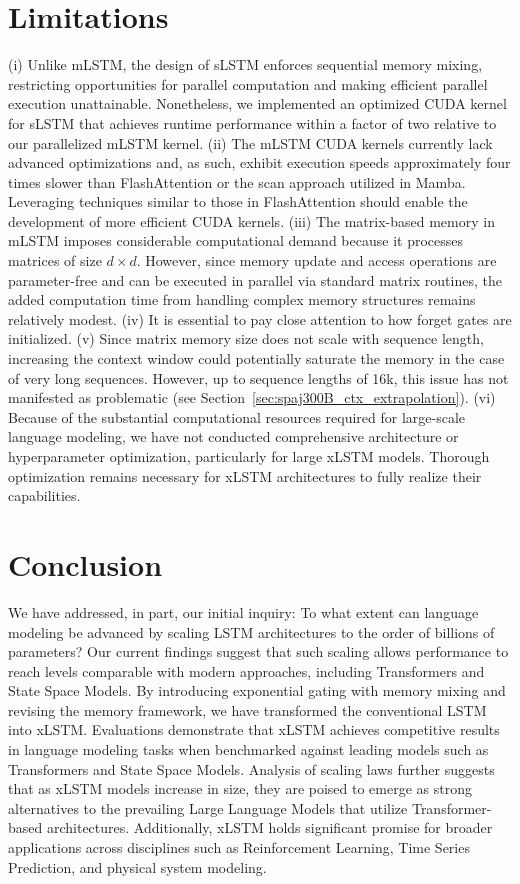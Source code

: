 \section{Limitations}

(i) Unlike mLSTM, the design of sLSTM enforces sequential memory mixing, restricting opportunities for parallel computation and making efficient parallel execution unattainable. Nonetheless, we implemented an optimized CUDA kernel for sLSTM that achieves runtime performance within a factor of two relative to our parallelized mLSTM kernel. (ii) The mLSTM CUDA kernels currently lack advanced optimizations and, as such, exhibit execution speeds approximately four times slower than FlashAttention or the scan approach utilized in Mamba. Leveraging techniques similar to those in FlashAttention should enable the development of more efficient CUDA kernels. (iii) The matrix-based memory in mLSTM imposes considerable computational demand because it processes matrices of size $d \times d$. However, since memory update and access operations are parameter-free and can be executed in parallel via standard matrix routines, the added computation time from handling complex memory structures remains relatively modest. (iv) It is essential to pay close attention to how forget gates are initialized. (v) Since matrix memory size does not scale with sequence length, increasing the context window could potentially saturate the memory in the case of very long sequences. However, up to sequence lengths of 16k, this issue has not manifested as problematic (see Section~\ref{sec:spaj300B_ctx_extrapolation}). (vi) Because of the substantial computational resources required for large-scale language modeling, we have not conducted comprehensive architecture or hyperparameter optimization, particularly for large xLSTM models. Thorough optimization remains necessary for xLSTM architectures to fully realize their capabilities.

\section{Conclusion}
We have addressed, in part, our initial inquiry: To what extent can language modeling be advanced by scaling LSTM architectures to the order of billions of parameters? Our current findings suggest that such scaling allows performance to reach levels comparable with modern approaches, including Transformers and State Space Models. By introducing exponential gating with memory mixing and revising the memory framework, we have transformed the conventional LSTM into xLSTM. Evaluations demonstrate that xLSTM achieves competitive results in language modeling tasks when benchmarked against leading models such as Transformers and State Space Models. Analysis of scaling laws further suggests that as xLSTM models increase in size, they are poised to emerge as strong alternatives to the prevailing Large Language Models that utilize Transformer-based architectures. Additionally, xLSTM holds significant promise for broader applications across disciplines such as Reinforcement Learning, Time Series Prediction, and physical system modeling.

